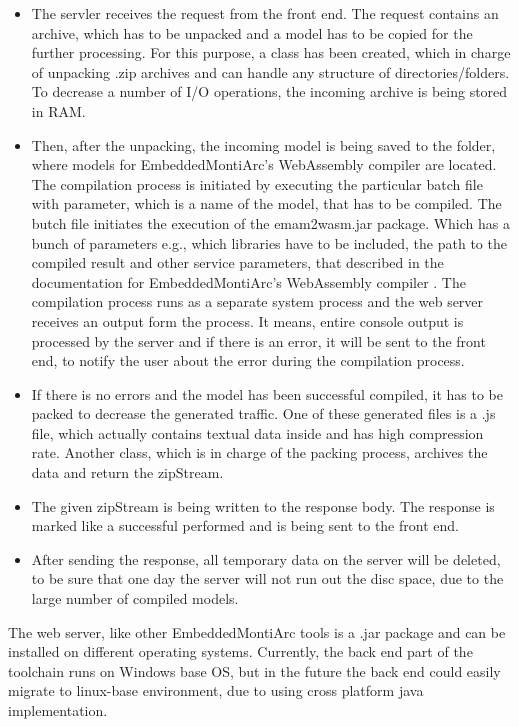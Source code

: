 \begin{itemize}
    \item The servler receives the request from the front end. The request contains an archive, which has to be unpacked and a model has to be copied for the further processing. For this purpose, a class has been created, which in charge of unpacking .zip archives and can handle any structure of directories/folders. To decrease a number of I/O operations, the incoming archive is being stored in RAM.
    \item Then, after the unpacking, the incoming model is being saved to the folder, where models for EmbeddedMontiArc's WebAssembly compiler are located. The compilation process is initiated by executing the particular batch file with parameter, which is a name of the model, that has to be compiled. The butch file initiates the execution of the emam2wasm.jar package. Which has a bunch of parameters e.g., which libraries have to be included, the path to the compiled result and other service parameters, that described in the documentation for EmbeddedMontiArc's WebAssembly compiler \cite{EMAM2Wasm}. The compilation process runs as a separate system process and the web server receives an output form the process. It means, entire console output is processed by the server and if there is an error, it will be sent to the front end, to notify the user about the error during the compilation process.
    \item If there is no errors and the model has been successful compiled, it has to be packed to decrease the generated traffic. One of these generated files is a .js file, which actually contains textual data inside and has high compression rate. Another class, which is in charge of the packing process, archives the data and return the zipStream.
    \item The given zipStream is being written to the response body. The response is marked like a successful performed and is being sent to the front end.
    \item After sending the response, all temporary data on the server will be deleted, to be sure that one day the server will not run out the disc space, due to the large number of compiled models.
\end{itemize}
The web server, like other EmbeddedMontiArc tools is a .jar package and can be installed on different operating systems. Currently, the back end part of the toolchain runs on Windows base OS, but in the future the back end could easily migrate to linux-base environment, due to using cross platform java implementation.

